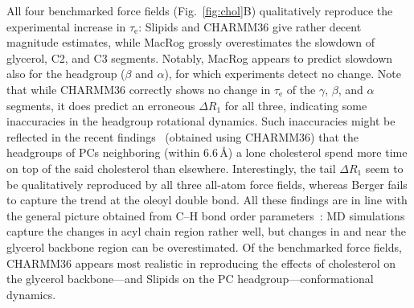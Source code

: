 \documentclass[journal=jcisd8,manuscript=article,layout=twocolumn]{achemso}
\begin{document}
All four benchmarked force fields (Fig.~\ref{fig:chol}B) qualitatively reproduce the experimental increase in $\tau_\mathrm e$:
Slipids and CHARMM36 give rather decent magnitude estimates, while MacRog grossly overestimates the slowdown of glycerol, C2, and C3 segments. Notably, MacRog appears to predict slowdown also for the headgroup ($\beta$ and $\alpha$), for which experiments detect no change.
%
Note that  while CHARMM36 correctly shows no change in $\tau_\mathrm{e}$
of the $\gamma$, $\beta$, and $\alpha$ segments,
it does predict an erroneous $\Delta R_{1}$ for all three, indicating some inaccuracies in the
headgroup rotational dynamics. %
Such inaccuracies might be reflected in the recent findings~\cite{leeb18}
(obtained using CHARMM36)
that 
the headgroups of PCs neighboring (within 6.6\,\AA) a lone cholesterol  spend more time on top of the said cholesterol than elsewhere.
%
Interestingly, 
the tail $\Delta R_{1}$ seem to be qualitatively reproduced by
all three all-atom force fields, whereas Berger fails to capture the trend at the oleoyl double bond.
%
%
All these findings are
in line with the general picture obtained from C--H bond order parameters~\cite{Ollila:2016a}: MD simulations capture the changes
in acyl chain region rather well, but changes in and near the glycerol backbone region can be overestimated.
%
Of the benchmarked force fields, CHARMM36 appears most realistic in reproducing the effects of cholesterol on the glycerol backbone---and Slipids on the PC headgroup---conformational dynamics.
\end{document}
